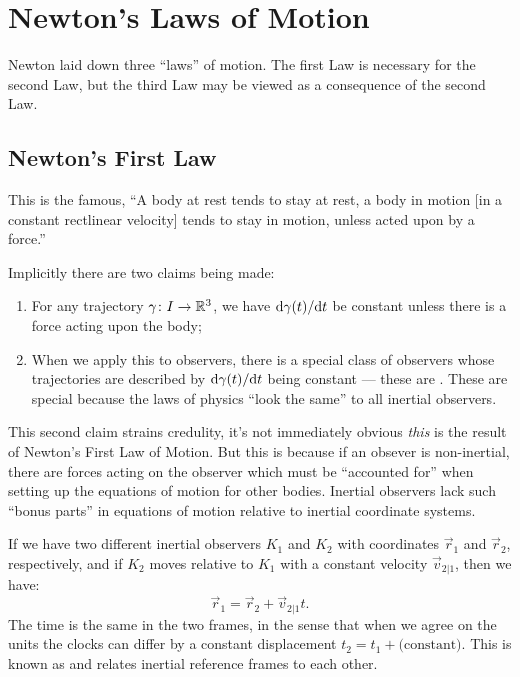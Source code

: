 \section{Newton's Laws of Motion}

\M
Newton laid down three ``laws'' of motion. The first Law is necessary
for the second Law, but the third Law may be viewed as a consequence of
the second Law.

\subsection{Newton's First Law}

This is the famous, ``A body at rest tends to stay at rest, a body in
motion [in a constant rectlinear velocity] tends to stay in motion,
unless acted upon by a force.''

Implicitly there are two claims being made:
\begin{enumerate}
\item For any trajectory $\gamma\colon I\to\mathbb{R}^{3}$, we have
  $\mathrm{d}\gamma(t)/\mathrm{d} t$ be constant unless there is a force acting upon the body;
\item When we apply this to observers, there is a special class of
  observers whose trajectories are described by $\mathrm{d}\gamma(t)/\mathrm{d} t$ being
  constant --- these are . These are special
  because the laws of physics ``look the same'' to all inertial observers.
\end{enumerate}

\M
This second claim strains credulity, it's not immediately obvious
\emph{this} is the result of Newton's First Law of Motion.
But this is because if an obsever is non-inertial, there are forces
acting on the observer which must be ``accounted for'' when setting up
the equations of motion for other bodies. Inertial observers lack such
``bonus parts'' in equations of motion relative to inertial coordinate
systems.

If we have two different inertial observers $K_{1}$ and $K_{2}$ with coordinates $\vec{r}_{1}$
and $\vec{r}_{2}$, respectively, and if $K_{2}$ moves relative to
$K_{1}$ with a constant velocity $\vec{v}_{2|1}$, then we have:
\begin{equation}
\vec{r}_{1} = \vec{r}_{2} + \vec{v}_{2|1}t.
\end{equation}
The time is the same in the two frames, in the sense that when we agree
on the units the clocks can differ by a constant displacement $t_{2}=t_{1}+\mbox{(constant)}$.
This is known as  and relates inertial
reference frames to each other.

